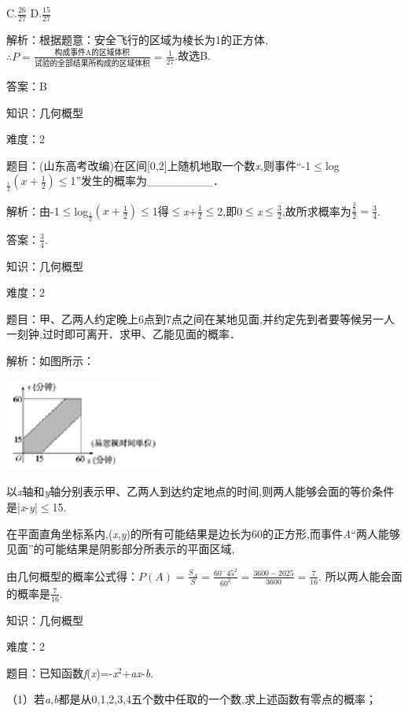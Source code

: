 \documentclass{article} %
\begin{document}
C.$\frac{26}{27}$  D.$\frac{15}{27}$

解析：根据题意：安全飞行的区域为棱长为1的正方体,$\mathrm{\therefore} P=\frac{\text{构成事件A的区域体积}}{\text{试验的全部结果所构成的区域体积}}=\frac{1}{27}$.故选B.

答案：B

知识：几何概型

难度：2

题目：(山东高考改编)在区间[0,2]上随机地取一个数\textit{x},则事件``-1$\mathrm{\le}$log${}_{\frac{1}{2} } (x+\frac{1}{2})\mathrm{\le}$1''发生的概率为\_\_\_\_\_\_\_\_．

解析：由-1$\mathrm{\le}$log${}_{\frac{1}{2} } (x+\frac{1}{2})\mathrm{\le}$1得$\mathrm{\le}$\textit{x}+$\frac{1}{2}\mathrm{\le}$2,即0$\mathrm{\le}$\textit{x}$\mathrm{\le}\frac{3}{2}$,故所求概率为$\frac{\frac{3}{2}}{2}=\frac{3}{4}$.

答案：$\frac{3}{4}$.

知识：几何概型

难度：2

题目：甲、乙两人约定晚上6点到7点之间在某地见面,并约定先到者要等候另一人一刻钟,过时即可离开．求甲、乙能见面的概率．

解析：如图所示：

\includegraphics*[width=2.11in, height=1.19in, keepaspectratio=false]{image107}

以\textit{x}轴和\textit{y}轴分别表示甲、乙两人到达约定地点的时间,则两人能够会面的等价条件是|\textit{x}-\textit{y}|$\mathrm{\le}$15.

在平面直角坐标系内,(\textit{x},\textit{y})的所有可能结果是边长为60的正方形,而事件\textit{A}``两人能够见面''的可能结果是阴影部分所表示的平面区域,

由几何概型的概率公式得：$P(A)=\frac{S_A}{S}=\frac{60^-45^2}{60^2}=\frac{3600-2025}{3600}=\frac{7}{16}$.
所以两人能会面的概率是$\frac{7}{16}$.

知识：几何概型

难度：2

题目：已知函数\textit{f}(\textit{x})=-\textit{x}${}^{2}$+\textit{ax}-\textit{b}.

（1）若\textit{a},\textit{b}都是从0,1,2,3,4五个数中任取的一个数,求上述函数有零点的概率；
\end{document}
